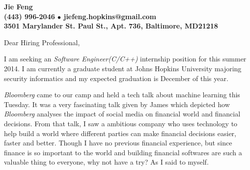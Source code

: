 \documentclass[11pt]{letter} %
\newcommand{\job}{\emph{Software Engineer(C/C++)}}
\newcommand{\company}{\emph{Bloomberg}}
\begin{document}

\begin{letter}{
} 


\begin{center}
\large\bf Jie Feng \\ %
 (443) 996-2046 $\bullet$ jiefeng.hopkins@gmail.com \\%
3501 Marylander St. Paul St., Apt. 736, Baltimore, MD21218 
\end{center} 
\vfill
\date{}
\vspace*{-40pt}
\signature{Jie Feng} %


\opening{Dear Hiring Professional,} 

I am seeking an \job{} internship position for this summer 2014.  I am currently a graduate student at Johns Hopkins University majoring security informatics and my expected graduation is December of this year.

\company{} came to our camp and held a tech talk about machine learning this Tuesday. It was a very fascinating talk
given by James which depicted how \company{} analyses the impact of social media on financial
world and financial decisions. From that talk, I saw a ambitious company who uses technology to help build a world where
different parties can make financial decisions easier, faster and better.
Though I have no previous financial experience, but since finance is so important to the world and building financial
softwares are such a valuable thing to everyone, why not have a try? As I said to myself.


\end{letter}
\end{document}
